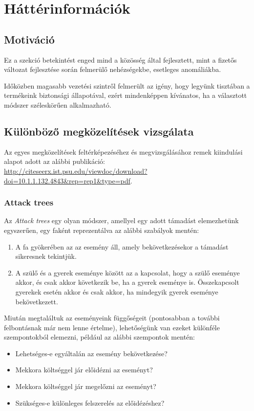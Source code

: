 \chapter{Háttérinformációk}

\section{Motiváció}
Ez a szekció betekintést enged mind a közösség által fejlesztett, mint a fizetős
 változat fejlesztése során felmerülő nehézségekbe, esetleges
anomáliákba.


Időközben magasabb vezetési szintről felmerült az igény, hogy legyünk tisztában a termékeink
biztonsági állapotával, ezért mindenképpen kívánatos, ha a választott módszer
széleskörűen alkalmazható.

\section{Különböző megközelítések vizsgálata}

Az egyes megközelítések feltérképezéséhez és megvizsgálásához remek kiindulási alapot adott az
alábbi publikáció:
\url{http://citeseerx.ist.psu.edu/viewdoc/download?doi=10.1.1.132.4843&rep=rep1&type=pdf}.

\subsection{Attack trees}

Az \emph{Attack trees} egy olyan módszer, amellyel egy adott támadást elemezhetünk egyszerűen, egy
faként reprezentálva az alábbi szabályok mentén:
\begin{enumerate}
    \item A fa gyökerében az az esemény áll, amely bekövetkezésekor a támadást sikeresnek tekintjük.
    \item A szülő és a gyerek eseménye között az a kapcsolat, hogy a szülő eseménye akkor, és csak
        akkor következik be, ha a gyerek eseménye is.  Összekapcsolt gyerekek esetén akkor és csak
        akkor, ha mindegyik gyerek eseménye bekövetkezett.
\end{enumerate}
Miután megtaláltuk az eseményeink függőségeit (pontosabban a további felbontásnak már nem lenne
értelme), lehetőségünk van ezeket különféle szempontokból elemezni, például az alábbi szempontok
mentén:
\begin{itemize}
    \item Lehetséges-e egyáltalán az esemény bekövetkezése?
    \item Mekkora költséggel jár előidézni az eseményt?
    \item Mekkora költséggel jár megelőzni az eseményt?
    \item Szükséges-e különleges felszerelés az előidézéshez?
\end{itemize}


